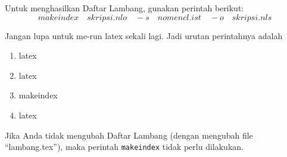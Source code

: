 Untuk menghasilkan Daftar Lambang, gunakan perintah berikut:
\begin{equation*}
    makeindex \quad skripsi.nlo\quad -s\quad nomencl.ist\quad -o\quad skripsi.nls
\end{equation*}

Jangan lupa untuk me-run latex sekali lagi. Jadi urutan perintahnya adalah
\begin{enumerate}
    \item latex
    \item latex
    \item makeindex 
    \item latex
\end{enumerate}

Jika Anda tidak mengubah Daftar Lambang (dengan mengubah file ``lambang.tex''), maka perintah \texttt{makeindex} tidak perlu dilakukan.



